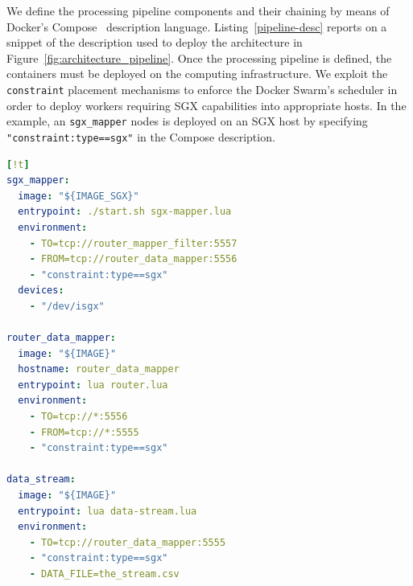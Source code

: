 We define the processing pipeline components and their chaining by means of Docker's Compose~\cite{docker:compose} description language.
Listing~\ref{pipeline-desc} reports on a snippet of the description used to deploy the architecture in Figure~\ref{fig:architecture_pipeline}.
Once the processing pipeline is defined, the containers must be deployed on the computing infrastructure.
We exploit the \texttt{constraint} placement mechanisms to enforce the Docker Swarm's scheduler in order to deploy workers requiring SGX capabilities into appropriate hosts.
In the example, an \texttt{sgx\_mapper} nodes is deployed on an SGX host by specifying \texttt{"constraint:type==sgx"} in the Compose description.
\begin{minipage}{\linewidth} %
\vspace{5pt}
\begin{lstlisting}[language=YAML,caption={\SYS pipeline examples. Some attributes (\texttt{volume}, \texttt{networks}, \texttt{env\_file}) are omitted.},label=pipeline-desc][!t]
sgx_mapper:
  image: "${IMAGE_SGX}"
  entrypoint: ./start.sh sgx-mapper.lua
  environment:
    - TO=tcp://router_mapper_filter:5557
    - FROM=tcp://router_data_mapper:5556
    - "constraint:type==sgx"
  devices:
    - "/dev/isgx"

router_data_mapper:
  image: "${IMAGE}"
  hostname: router_data_mapper
  entrypoint: lua router.lua
  environment:
    - TO=tcp://*:5556
    - FROM=tcp://*:5555
    - "constraint:type==sgx"

data_stream:
  image: "${IMAGE}"
  entrypoint: lua data-stream.lua
  environment:
    - TO=tcp://router_data_mapper:5555
    - "constraint:type==sgx"
    - DATA_FILE=the_stream.csv
\end{lstlisting}
\end{minipage}
